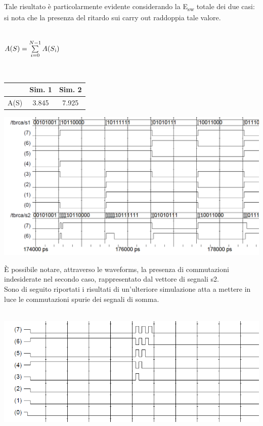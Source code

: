 \documentclass[11pt,  english, makeidx, a4paper, titlepage, oneside]{book}
\begin{document}
\\\\
Tale risultato è particolarmente evidente considerando la E\textsubscript{sw} totale dei due casi: si nota che la presenza del ritardo sui carry out raddoppia tale valore.\\\\
\centerline{$A(S) = \sum\limits_{i=0}^{N-1} A(S\textsubscript{i})$}\\
\vspace{0.2cm}
\begin{center}
\begin{tabular}{|c|c|c|}
\hline
 & Sim. 1 & Sim. 2 \\
\hline
A(S) & 3.845 & 7.925\\
\hline
\end{tabular}
\end{center}
\vspace{0.3cm}
\centerline{\includegraphics[width=15cm]{./img/Lab_1/Es_2/Glitch.png}}
\vspace{0.3cm}
È possibile notare, attraverso le waveforms, la presenza di commutazioni indesiderate nel secondo caso, rappresentato dal vettore di segnali s2.
\\
Sono di seguito riportati i risultati di un'ulteriore simulazione atta a mettere in luce le commutazioni spurie dei segnali di somma.
\\\\
 \centerline{\includegraphics[width=15cm]{./img/Lab_1/Es_2/Glitch_worst_case.png}}
\end{document}
